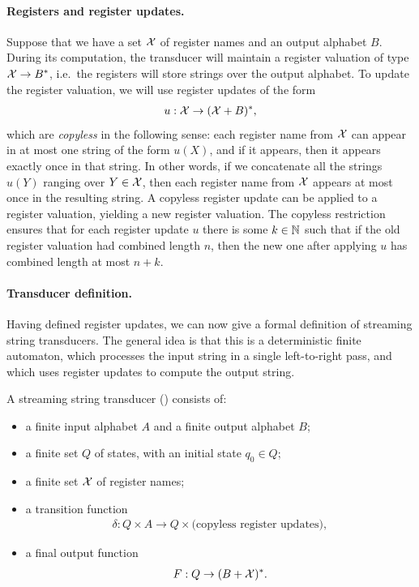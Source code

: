 \paragraph*{Registers and register updates.}
Suppose that we have a set $\mathcal X$ of register names and an output alphabet $B$.  During its computation, the transducer will maintain a register valuation of type $\mathcal X \to B^*$, i.e.~the registers will store strings over the output alphabet. To update the register valuation, we will use register updates of the form 
\begin{align*}
 u : \mathcal X \to (\mathcal X + B)^*,
\end{align*}
which are \emph{copyless} in the following sense: each register name from $\mathcal X$ can appear in at most one string of the form $u(X)$, and if it appears, then it appears exactly once in that string. In other words, if we concatenate all the strings $u(Y)$ ranging over $Y \in \mathcal X$, then each register name from $\mathcal X$ appears at most once in the resulting string. A copyless register update can be applied to a register valuation, yielding a new register valuation. The copyless restriction ensures that for each register update $u$ there is some $k \in {\mathbb N}$ such that if the old register valuation had combined length $n$, then the new one after applying $u$ has combined length at most $n+k$. 

\paragraph*{Transducer definition.} Having defined register updates, we can now give a formal definition of streaming string transducers. The general idea is that this is a deterministic finite automaton, which processes the input string in a single left-to-right pass, and which uses register updates to compute the output string.
\begin{definition}
    [\sst]
    \label{def:sst}
    A streaming string transducer (\sst) consists of: 
    \begin{itemize}
        \item a finite input alphabet $A$ and a finite output alphabet $B$;
        \item a finite set $Q$ of states, with an initial state $q_0 \in Q$;
        \item a finite set $\mathcal X$ of register names;
        \item a transition function 
        \begin{align*}
        \delta : Q \times A \to Q \times \text{(copyless register updates)},
        \end{align*}
        \item a final output function
        \begin{align*}
        F : Q \to (B + \mathcal X)^*.
        \end{align*}
    \end{itemize}
\end{definition}



